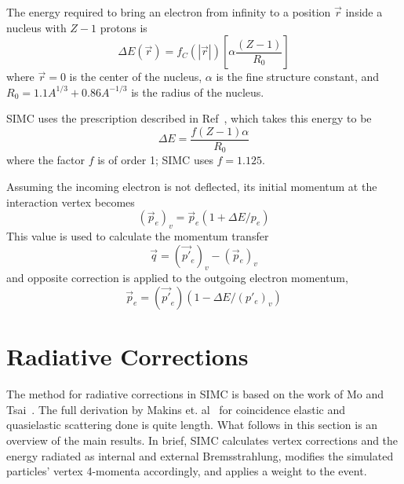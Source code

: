 The energy required to bring an electron from infinity to a position $\vec{r}$
inside a nucleus with $Z-1$ protons is
\begin{equation}
    \Delta E(\vec{r})=f_{C}(|\vec{r}|)\left[\alpha \frac{(Z-1)}{R_{0}}\right]
\end{equation}
where
$\vec{r}=0$ is the center of the nucleus,
$\alpha$ is the fine structure constant,
and
$R_0=1.1 A^{1/3}+0.86 A^{-1/3}$ is the radius of the nucleus.


SIMC uses the prescription described in Ref~\cite{Aste_2005}, which
takes this energy to be
\begin{equation}
    \Delta E = \frac{f(Z-1)\alpha}{R_0}
\end{equation}
where the factor $f$ is of order 1; SIMC uses $f=1.125$.


Assuming the incoming electron is not deflected, its initial momentum at the
interaction vertex becomes
\begin{equation}
    (\vec{p}_e)_v = \vec{p}_e(1 + \Delta E / p_e)
\end{equation}
This value is used to calculate the momentum transfer
\begin{equation}
    \vec{q} = (\vec{p'}_e)_v - (\vec{p}_e)_v
\end{equation}
and opposite correction is applied to the outgoing electron momentum,
\begin{equation}
    \vec{p}_e = (\vec{p'}_e)(1 - \Delta E / (p'_e)_v)
\end{equation}




\section{Radiative Corrections}
The method for radiative corrections in SIMC is based on the work of
Mo and Tsai~\cite{Mo_1969}.
The full derivation by Makins et. al~\cite{Ent_2001, Makins_1994} for
coincidence elastic and quasielastic scattering done is quite length.
What follows in this section is an overview of the main results.
In brief, SIMC calculates vertex corrections and the energy radiated
as internal and external Bremsstrahlung, modifies the simulated particles'
vertex 4-momenta accordingly, and applies a weight to the event.

